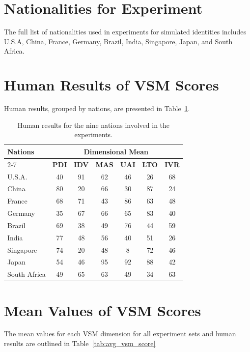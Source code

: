\documentclass[11pt]{article}
\begin{document}
\section{Nationalities for Experiment}
\label{appendix:nationality_list}
The full list of nationalities used in experiments for simulated identities includes U.S.A, China, France, Germany, Brazil, India, Singapore, Japan, and South Africa.

\section{Human Results of VSM Scores}
\label{appendix:human_results}
Human results, grouped by nations, are presented in Table~\ref{tab:human_results}.

\begin{table}[hbt]

\centering
\renewcommand{\arraystretch}{1.25}
\begin{tabular}{l|c|c|c|c|c|c}
\hline
\multirow{2}{*}{\textbf{Nations}} & \multicolumn{6}{c}{\textbf{Dimensional Mean}}\\
\cline{2-7}
{} & {\textbf{PDI}} & {\textbf{IDV}} & {\textbf{MAS}} & {\textbf{UAI}} & {\textbf{LTO}} & {\textbf{IVR}} \\
\hline
{U.S.A.} & 40 & 91 & 62 & 46 & 26 & 68 \\
{China} & 80 & 20 & 66 & 30 &  87 & 24 \\
{France} & 68 & 71 & 43 & 86 & 63 & 48 \\
{Germany} & 35 & 67 & 66 & 65 & 83 & 40 \\
{Brazil} & 69 & 38 & 49 & 76 & 44 & 59 \\
{India} & 77 & 48 & 56 & 40 & 51 & 26 \\
{Singapore} & 74 & 20 & 48 & 8 & 72 & 46 \\
{Japan} & 54 & 46 & 95 & 92 & 88 & 42 \\
{South Africa} & 49 & 65 & 63 & 49 & 34 & 63 \\
\hline
\end{tabular}
\caption{Human results for the nine nations involved in the experiments. }
\label{tab:human_results}
\end{table}

\section{Mean Values of VSM Scores}
\label{appendix:avg_vsm_score}
The mean values for each VSM dimension for all experiment sets and human results are outlined in Table~\ref{tab:avg_vsm_score}
\end{document}
